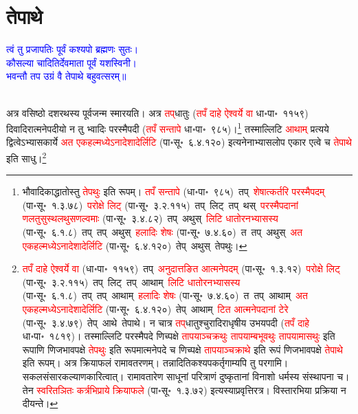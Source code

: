 \section[तेपाथे]{तेपाथे}
\centering\textcolor{blue}{त्वं तु प्रजापतिः पूर्वं कश्यपो ब्रह्मणः सुतः।\nopagebreak\\
कौसल्या चादितिर्देवमाता पूर्वं यशस्विनी।\nopagebreak\\
भवन्तौ तप उग्रं वै तेपाथे बहुवत्सरम्॥}\nopagebreak\\
\\
\fontsize{14}{21}\selectfont\begin{sloppypar}\justifying\noindent\hspace{10mm} अत्र वसिष्ठो दशरथस्य पूर्व\-जन्म स्मारयति। अत्र \textcolor{red}{तप्‌}\-धातुः (\textcolor{red}{तपँ दाहे ऐश्वर्ये वा} धा॰पा॰~११५९) दिवादिरात्मनेपदीयो न तु भ्वादिः परस्मैपदी (\textcolor{red}{तपँ सन्तापे} धा॰पा॰~९८५)।\footnote{भौवादिकाद्धातोस्तु \textcolor{red}{तेपथुः} इति रूपम्। \textcolor{red}{तपँ सन्तापे} (धा॰पा॰~९८५)~\arrow तप्~\arrow \textcolor{red}{शेषात्कर्तरि परस्मैपदम्} (पा॰सू॰~१.३.७८)~\arrow \textcolor{red}{परोक्षे लिट्} (पा॰सू॰~३.२.११५)~\arrow तप्~लिट्~\arrow तप्~थस्~\arrow \textcolor{red}{परस्मैपदानां णलतुसुस्थलथुस\-णल्वमाः} (पा॰सू॰~३.४.८२)~\arrow तप्~अथुस्~\arrow \textcolor{red}{लिटि धातोरनभ्यासस्य} (पा॰सू॰~६.१.८)~\arrow तप्~तप्~अथुस्~\arrow \textcolor{red}{हलादिः शेषः} (पा॰सू॰~७.४.६०)~\arrow त~तप्~अथुस्~\arrow \textcolor{red}{अत एकहल्मध्येऽनादेशादेर्लिटि} (पा॰सू॰~६.४.१२०)~\arrow तेप्~अथुस्~\arrow तेपथुः।} तस्माल्लिटि \textcolor{red}{आथाम्} प्रत्यये द्वित्वेऽभ्यास\-कार्ये \textcolor{red}{अत एकहल्मध्येऽनादेशादेर्लिटि} (पा॰सू॰~६.४.१२०) इत्यनेनाभ्यास\-लोप एकार एत्वे च \textcolor{red}{तेपाथे} इति साधु।\footnote{\textcolor{red}{तपँ दाहे ऐश्वर्ये वा} (धा॰पा॰~११५९)~\arrow तप्~\arrow \textcolor{red}{अनुदात्तङित आत्मने\-पदम्} (पा॰सू॰~१.३.१२)~\arrow \textcolor{red}{परोक्षे लिट्} (पा॰सू॰~३.२.११५)~\arrow तप्~लिट्~\arrow तप्~आथाम्~\arrow \textcolor{red}{लिटि धातोरनभ्यासस्य} (पा॰सू॰~६.१.८)~\arrow तप्~तप्~आथाम्~\arrow \textcolor{red}{हलादिः शेषः} (पा॰सू॰~७.४.६०)~\arrow त~तप्~आथाम्~\arrow \textcolor{red}{अत एकहल्मध्येऽनादेशादेर्लिटि} (पा॰सू॰~६.४.१२०)~\arrow तेप्~आथाम्~\arrow \textcolor{red}{टित आत्मनेपदानां टेरे} (पा॰सू॰~३.४.७९)~\arrow तेप्~आथे~\arrow तेपाथे। न चात्र \textcolor{red}{तप्‌}\-धातुश्चुरादिराधृषीय उभयपदी (\textcolor{red}{तपँ दाहे} धा॰पा॰~१८१९)। तस्माल्लिटि परस्मैपदे णिच्पक्षे \textcolor{red}{तापयाञ्चक्रथुः तापयाम्बभूवथुः तापयामासथुः} इति रूपाणि णिजभाव\-पक्षे \textcolor{red}{तेपथुः} इति रूपमात्मने\-पदे च णिच्पक्षे \textcolor{red}{तापयाञ्चक्राथे} इति रूपं णिजभाव\-पक्षे \textcolor{red}{तेपाथे} इति रूपम्। अत्र क्रियाफलं रामावतरणम्। तन्नादिति\-कश्यप\-कर्तृगाम्यपि तु परगामि। सकल\-संसार\-कल्याणकारित्वात्। रामावतारेण साधूनां परित्राणं दुष्कृतानां विनाशो धर्मस्य संस्थापना च। तेन \textcolor{red}{स्वरितञितः कर्त्रभिप्राये क्रियाफले} (पा॰सू॰~१.३.७२) इत्यस्याप्रवृत्तिरत्र। विस्तार\-भिया प्रक्रिया न दीयन्ते।}\end{sloppypar}
